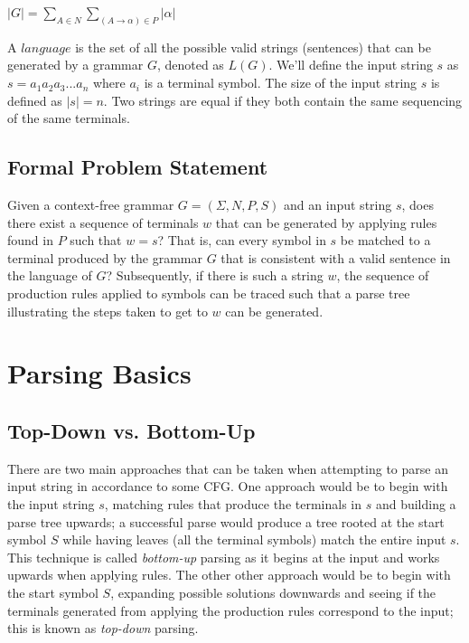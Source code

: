 \documentclass[a4paper, 11pt]{article}
\begin{document}
\begin{center} $|G| = \displaystyle\sum\limits_{A \in N} \displaystyle\sum\limits_{(A \to \alpha) \in P} | \alpha |$ \end{center}

A $language$ is the set of all the possible valid strings (sentences) that can be generated by a grammar $G$, denoted as $L(G)$.
We'll define the input string $s$ as $s = a_1 a_2 a_3 ... a_n$ where $a_i$ is a terminal symbol. The size of the input string $s$ is defined as $|s| = n$. Two strings
are equal if they both contain the same sequencing of the same terminals. 

\subsection{Formal Problem Statement}
Given a context-free grammar $G=( \Sigma, N, P, S)$ and an input string $s$, does there exist a sequence of terminals $w$ that can be generated by  
applying rules found in $P$ such that $w=s$? That is, can every symbol in $s$ be matched to a terminal produced by the grammar $G$ that is consistent with a valid sentence 
in the language of $G$? Subsequently, if there is such a string $w$, the sequence of production rules applied to symbols can be traced
such that a parse tree illustrating the steps taken to get to $w$ can be generated.

\section{Parsing Basics}

\subsection{Top-Down vs. Bottom-Up}
There are two main approaches that can be taken when attempting to parse an input string in accordance to some CFG. One approach would be to begin with the input string
$s$, matching rules that produce the terminals in $s$ and building a parse tree upwards; a successful parse would produce a tree rooted at the start symbol $S$ while 
having leaves (all the terminal symbols) match the entire input $s$. This technique is called \textit{bottom-up} parsing as it begins at the input and works upwards when
applying rules. The other other approach would be to begin with the start symbol $S$, expanding possible solutions downwards and seeing if the terminals generated from applying
the production rules correspond to the input; this is known as \textit{top-down} parsing.  
\end{document}
